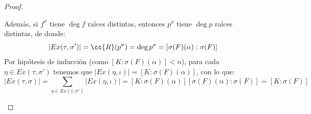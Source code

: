 \begin{prop}
\begin{proof}
\begin{itemize}
                Además, si $f^\sigma$ tiene $\deg f$ raíces distintas, entonces $p^\sigma$ tiene $\deg p$ raíces distintas, de donde:
                \begin{equation*}
                    |Ex(\tau,\sigma')| = \cc{R}(p^\sigma) = \deg p^{\sigma} = [\sigma(F)(\alpha):\sigma(F)]
                \end{equation*}
                Por hipótesis de inducción (como $[K:\sigma(F)(\alpha)]<n$), para cada $\eta \in Ex(\tau,\sigma')$ tenemos que $|Ex(\eta, \iota)| = [K:\sigma(F)(\alpha)]$, con lo que:
                \begin{equation*}
                    |Ex(\tau,\sigma)| = \sum_{\eta \in  Ex(\tau, \sigma')}|Ex(\eta,\iota)| = [K:\sigma(F)(\alpha)][\sigma(F)(\alpha):\sigma(F)] = [K:\sigma(F)]
                \end{equation*}
        \end{itemize}
    \end{proof}
\end{prop}

